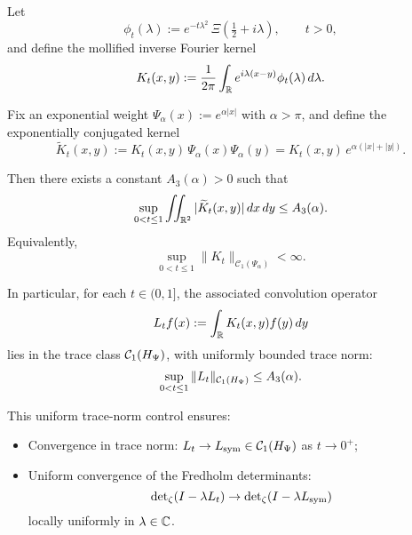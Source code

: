 \begin{lemma}
\label{lem:uniform_L1_conjugated_kernel}
Let
\[
\phi_t(\lambda) := e^{-t\lambda^2} \, \Xi\left( \tfrac{1}{2} + i\lambda \right), \qquad t > 0,
\]
and define the mollified inverse Fourier kernel
\[
K_t(x,y) := \frac{1}{2\pi} \int_{\mathbb{R}} e^{i\lambda(x - y)} \phi_t(\lambda) \, d\lambda.
\]

Fix an exponential weight \( \Psi_\alpha(x) := e^{\alpha |x|} \) with \( \alpha > \pi \), and define the exponentially conjugated kernel
\[
\widetilde{K}_t(x,y) := K_t(x,y)\, \Psi_\alpha(x)\Psi_\alpha(y) = K_t(x,y)\, e^{\alpha(|x| + |y|)}.
\]

Then there exists a constant \( A_3(\alpha) > 0 \) such that
\[
\sup_{0 < t \le 1} \iint_{\mathbb{R}^2} |\widetilde{K}_t(x,y)| \, dx\,dy \le A_3(\alpha).
\]
Equivalently,
\[
\sup_{0 < t \le 1} \|K_t\|_{\mathcal{C}_1(\Psi_\alpha)} < \infty.
\]

In particular, for each \( t \in (0,1] \), the associated convolution operator
\[
L_t f(x) := \int_{\mathbb{R}} K_t(x,y) f(y)\, dy
\]
lies in the trace class \( \mathcal{C}_1(H_{\Psi}) \), with uniformly bounded trace norm:
\[
\sup_{0 < t \le 1} \|L_t\|_{\mathcal{C}_1(H_{\Psi})} \le A_3(\alpha).
\]

\medskip
\noindent
This uniform trace-norm control ensures:
\begin{itemize}
    \item Convergence in trace norm: \( L_t \to L_{\mathrm{sym}} \in \mathcal{C}_1(H_{\Psi}) \) as \( t \to 0^+ \);
    \item Uniform convergence of the Fredholm determinants:
    \[
    \det\nolimits_\zeta(I - \lambda L_t) \to \det\nolimits_\zeta(I - \lambda L_{\mathrm{sym}})
    \]
    locally uniformly in \( \lambda \in \mathbb{C} \).
\end{itemize}
\end{lemma}
